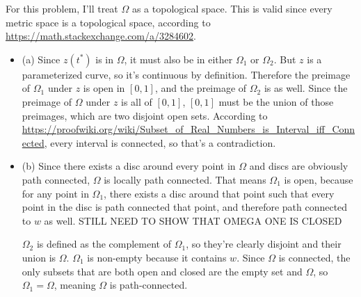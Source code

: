 \documentclass[12pt]{article}
\begin{document}
For this problem, I'll treat $\Omega$ as a topological space. This is valid since every metric space is a topological space, according to \url{https://math.stackexchange.com/a/3284602}.
\begin{itemize}
    \item (a) Since $z(t^*)$ is in $\Omega$, it must also be in either $\Omega_1$ or $\Omega_2$. But $z$ is a parameterized curve, so it's continuous by definition. Therefore the preimage of $\Omega_1$ under $z$ is open in $[0, 1]$, and the preimage of $\Omega_2$ is as well. Since the preimage of $\Omega$ under $z$ is all of $[0, 1]$, $[0, 1]$ must be the union of those preimages, which are two disjoint open sets. According to \url{https://proofwiki.org/wiki/Subset_of_Real_Numbers_is_Interval_iff_Connected}, every interval is connected, so that's a contradiction.
    \item (b) Since there exists a disc around every point in $\Omega$ and discs are obviously path connected, $\Omega$ is locally path connected. That means $\Omega_1$ is open, because for any point in $\Omega_1$, there exists a disc around that point such that every point in the disc is path connected that point, and therefore path connected to $w$ as well. STILL NEED TO SHOW THAT OMEGA ONE IS CLOSED
        \par
        $\Omega_2$ is defined as the complement of $\Omega_1$, so they're clearly disjoint and their union is $\Omega$. $\Omega_1$ is non-empty because it contains $w$. Since $\Omega$ is connected, the only subsets that are both open and closed are the empty set and $\Omega$, so $\Omega_1 = \Omega$, meaning $\Omega$ is path-connected.
\end{itemize}
\end{document}
